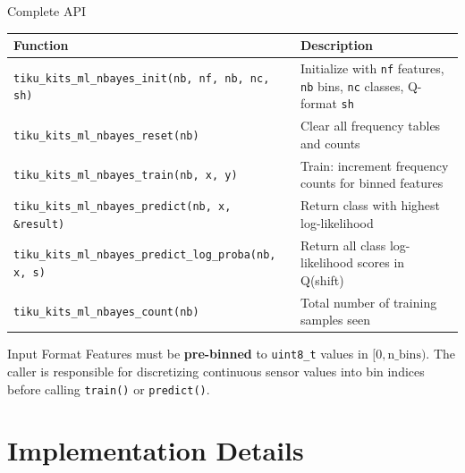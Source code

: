\documentclass[aspectratio=169, 10pt]{beamer}
\begin{document}
\begin{frame}[fragile]{Complete API}
\begin{table}
\centering
\small
\begin{tabular}{@{}lp{8cm}@{}}
\toprule
\textbf{Function} & \textbf{Description} \\
\midrule
\texttt{tiku\_kits\_ml\_nbayes\_init(nb, nf, nb, nc, sh)}
  & Initialize with \texttt{nf} features, \texttt{nb} bins,
    \texttt{nc} classes, Q-format \texttt{sh} \\
\texttt{tiku\_kits\_ml\_nbayes\_reset(nb)}
  & Clear all frequency tables and counts \\
\midrule
\texttt{tiku\_kits\_ml\_nbayes\_train(nb, x, y)}
  & Train: increment frequency counts for binned features \\
\texttt{tiku\_kits\_ml\_nbayes\_predict(nb, x, \&result)}
  & Return class with highest log-likelihood \\
\texttt{tiku\_kits\_ml\_nbayes\_predict\_log\_proba(nb, x, s)}
  & Return all class log-likelihood scores in Q(shift) \\
\midrule
\texttt{tiku\_kits\_ml\_nbayes\_count(nb)}
  & Total number of training samples seen \\
\bottomrule
\end{tabular}
\end{table}

\vspace{0.3em}
\begin{alertblock}{Input Format}
Features must be \textbf{pre-binned} to \texttt{uint8\_t} values in
$[0, \text{n\_bins})$. The caller is responsible for discretizing
continuous sensor values into bin indices before calling
\texttt{train()} or \texttt{predict()}.
\end{alertblock}
\end{frame}

\section{Implementation Details}
\end{document}
